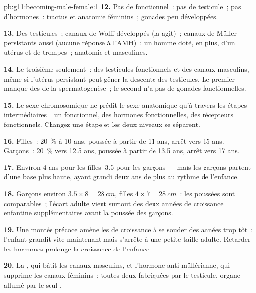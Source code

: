 \begin{solution}{pb:g11:becoming-male-female:1}
\textbf{12.} Pas de  fonctionnel~: pas de testicule~; pas
d'hormones~: tractus et anatomie féminins~; gonades peu développées.

\textbf{13.} Des testicules~; canaux de Wolff développés (la
 agit)~; canaux de Müller persistants aussi (aucune réponse
à l'AMH)~: un homme doté, en plus, d'un utérus et de trompes~; anatomie
et  masculines.

\textbf{14.} Le troisième seulement~: des testicules fonctionnels et
des canaux masculins, même si l'utérus persistant peut gêner la
descente des testicules. Le premier manque des  de la
spermatogenèse~; le second n'a pas de gonades fonctionnelles.

\textbf{15.} Le sexe chromosomique ne prédit le sexe anatomique qu'à
travers les étapes intermédiaires~: un  fonctionnel, des hormones
fonctionnelles, des récepteurs fonctionnels. Changez une étape et les
deux niveaux se séparent.

\textbf{16.} Filles~: 20~\% à 10 ans, poussée à partir de 11 ans,
arrêt vers 15 ans. Garçons~: 20~\% vers 12.5 ans, poussée à partir de
13.5 ans, arrêt vers 17 ans.

\textbf{17.} Environ 4 ans pour les filles, 3.5 pour les garçons ---
mais les garçons partent d'une base plus haute, ayant grandi deux ans
de plus au rythme de l'enfance.

\textbf{18.} Garçons environ $3.5 \times 8 = \qty{28}{cm}$, filles $4 \times
7 = \qty{28}{cm}$~: les poussées sont comparables~; l'écart adulte
vient surtout des deux années de croissance enfantine
supplémentaires avant la poussée des garçons.

\textbf{19.} Une montée précoce amène les  de croissance à se
souder des années trop tôt~: l'enfant grandit vite maintenant mais
s'arrête à une petite taille adulte. Retarder les hormones prolonge la
croissance de l'enfance.

\textbf{20.} La , qui bâtit les canaux masculins, et
l'hormone anti-müllérienne, qui supprime les canaux féminins~; toutes
deux fabriquées par le testicule, organe allumé par le seul .
\end{solution}
